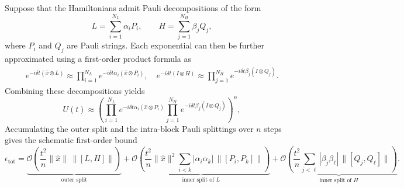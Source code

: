 \documentclass{article}
\begin{document}
Suppose that the Hamiltonians admit Pauli decompositions of the form
\begin{equation}
     L = \sum_{i=1}^{N_L} \alpha_i P_i,
    \qquad
     H = \sum_{j=1}^{N_H} \beta_j Q_j,
\end{equation}
where $P_i$ and $Q_j$ are Pauli strings. Each exponential can then be further approximated using a first-order product formula as
\begin{align}
    e^{-i\delta t(\hat x \otimes L)} \approx
    \prod_{i=1}^{N_L} e^{-i\delta t \alpha_i (\hat x \otimes P_i)},\quad
    e^{-i\delta t(I \otimes H)} \approx
    \prod_{j=1}^{N_H} e^{-i\delta t \beta_j (I \otimes Q_j)}.
\end{align}
Combining these decompositions yields
\begin{equation}
    U(t) \approx
    \left(
    \prod_{i=1}^{N_L} e^{-i\delta t \alpha_i (\hat x \otimes P_i)}
    \prod_{j=1}^{N_H} e^{-i\delta t \beta_j (I \otimes Q_j)}
    \right)^n,
\end{equation}
Accumulating the outer split and the intra-block Pauli splittings over $n$ steps gives the schematic first-order bound
\begin{equation}
\epsilon_{\mathrm{tot}} = \underbrace{\mathcal{O}\!\left(\frac{t^2}{n}\|\hat{x}\|\,\|[L,H]\|\right)}_{\text{outer split}} + \underbrace{\mathcal{O}\!\left(\frac{t^2}{n}\|\hat{x}\|^2\sum_{i<k}|\alpha_i\alpha_k|\,\|[P_i,P_k]\|\right)}_{\text{inner split of }L} + \underbrace{\mathcal{O}\!\left(\frac{t^2}{n}\sum_{j<\ell}|\beta_j\beta_\ell|\,\|[Q_j,Q_\ell]\|\right)}_{\text{inner split of }H}.
\label{eq:two-layer-error}
\end{equation}



\end{document}
